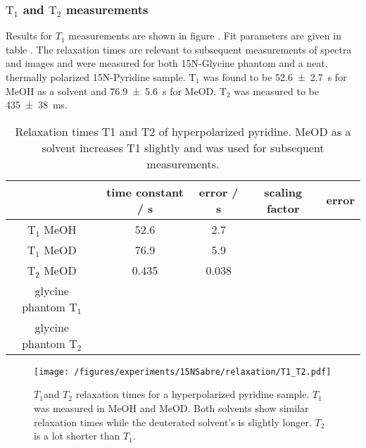     \subsubsection{$\mathrm{T_1}$ and $\mathrm{T_2}$ measurements}
        Results for $T_1$ measurements are shown in figure . Fit parameters are given in table .
        The relaxation times are relevant to subsequent measurements of spectra and images and were measured for both 15N-Glycine phantom and a neat, thermally polarized 15N-Pyridine sample. $\mathrm{T}_1$ was found to be \SI{52.6\pm 2.7}{\second} for MeOH as a solvent and \SI{76.9\pm 5.6}{\second} for MeOD. $\mathrm{T}_2$ was measured to be \SI{435\pm 38}{\milli\second}.
        \begin{table}
            \begin{tabular}{|c|c|c|c|c|}
                \hline
                    & time constant / s & error / s & scaling factor & error\\
                    \hline
                $\mathrm{T_1}$ MeOH & 52.6 & 2.7 & & \\
                $\mathrm{T_1}$ MeOD & 76.9 & 5.9 & & \\
                $\mathrm{T_2}$ MeOD &  0.435 & 0.038 & &\\
                glycine phantom $\mathrm{T_1}$& & &  & \\
                glycine phantom $\mathrm{T_2}$& & & &  \\
                \hline
            \end{tabular}
            \caption[Relaxation times]{Relaxation times T1 and T2 of hyperpolarized pyridine. MeOD as a solvent increases T1 slightly and was used for subsequent measurements.}
        \end{table}
        \begin{figure}
            \texttt{[image: /figures/experiments/15NSabre/relaxation/T1\_T2.pdf]}
            \caption[T1/T2 of 15N]{$T_1$and $T_2$ relaxation times for a hyperpolarized pyridine sample. $T_1$ was measured in MeOH and MeOD. Both solvents show similar relaxation times while the deuterated solvent's is slightly longer. $T_2$ is a lot shorter than $T_1$.}
        \end{figure}
